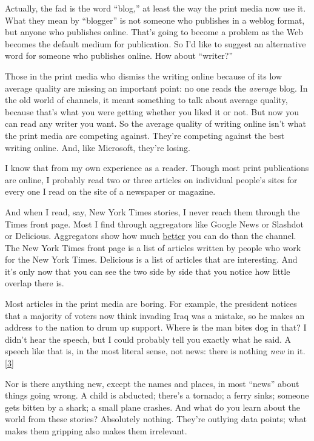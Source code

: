 Actually, the fad is the word ``blog,'' at least the way the print media
now use it. What they mean by ``blogger'' is not someone who publishes
in a weblog format, but anyone who publishes online. That's going to
become a problem as the Web becomes the default medium for publication.
So I'd like to suggest an alternative word for someone who publishes
online. How about ``writer?''

Those in the print media who dismiss the writing online because of its
low average quality are missing an important point: no one reads the
\emph{average} blog. In the old world of channels, it meant something to
talk about average quality, because that's what you were getting whether
you liked it or not. But now you can read any writer you want. So the
average quality of writing online isn't what the print media are
competing against. They're competing against the best writing online.
And, like Microsoft, they're losing.

I know that from my own experience as a reader. Though most print
publications are online, I probably read two or three articles on
individual people's sites for every one I read on the site of a
newspaper or magazine.

And when I read, say, New York Times stories, I never reach them through
the Times front page. Most I find through aggregators like Google News
or Slashdot or Delicious. Aggregators show how much
\href{http://reddit.com}{better} you can do than the channel. The New
York Times front page is a list of articles written by people who work
for the New York Times. Delicious is a list of articles that are
interesting. And it's only now that you can see the two side by side
that you notice how little overlap there is.

Most articles in the print media are boring. For example, the president
notices that a majority of voters now think invading Iraq was a mistake,
so he makes an address to the nation to drum up support. Where is the
man bites dog in that? I didn't hear the speech, but I could probably
tell you exactly what he said. A speech like that is, in the most
literal sense, not news: there is nothing \emph{new} in it.
{[}\hyperref[f3n]{3}{]}

Nor is there anything new, except the names and places, in most ``news''
about things going wrong. A child is abducted; there's a tornado; a
ferry sinks; someone gets bitten by a shark; a small plane crashes. And
what do you learn about the world from these stories? Absolutely
nothing. They're outlying data points; what makes them gripping also
makes them irrelevant.

